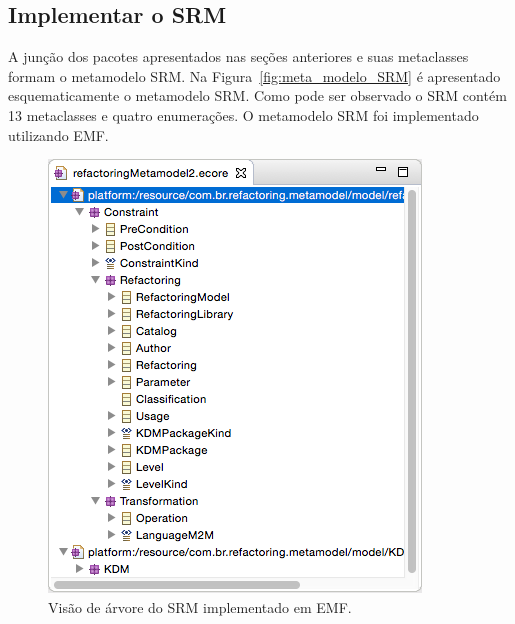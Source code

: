 


\subsection{Implementar o SRM}\label{sec:implementacao_do_SRM}

A junção dos pacotes apresentados nas seções anteriores e suas metaclasses formam o metamodelo SRM. Na Figura~\ref{fig:meta_modelo_SRM} é apresentado esquematicamente o metamodelo SRM. Como pode ser observado o SRM contém 13 metaclasses e quatro enumerações. O metamodelo SRM foi implementado utilizando EMF.

\begin{figure}[h]
	\centering
	\caption{Visão de árvore do SRM implementado em EMF.}
	\label{fig:visao_arvore_srm_emf}
	\includegraphics[scale=0.65]{images/srm_emf}
	\fautor
\end{figure}

